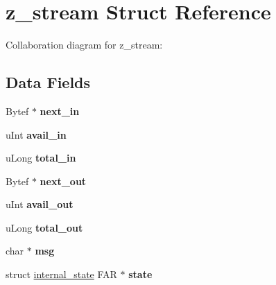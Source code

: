 \hypertarget{structz__stream}{\section{z\-\_\-stream Struct Reference}
\label{d2/d34/structz__stream}
}


Collaboration diagram for z\-\_\-stream\-:
\subsection*{Data Fields}
\begin{DoxyCompactItemize}
\item 
\hypertarget{structz__stream_abea40a334c642cae56275e32f1bd7f11}{Bytef $\ast$ {\bfseries next\-\_\-in}}\label{d2/d34/structz__stream_abea40a334c642cae56275e32f1bd7f11}

\item 
\hypertarget{structz__stream_a687b6a0bbb7485527e4f9d1a443b144b}{u\-Int {\bfseries avail\-\_\-in}}\label{d2/d34/structz__stream_a687b6a0bbb7485527e4f9d1a443b144b}

\item 
\hypertarget{structz__stream_a37acd10cd6841ba0ad5bee7c910e5ef9}{u\-Long {\bfseries total\-\_\-in}}\label{d2/d34/structz__stream_a37acd10cd6841ba0ad5bee7c910e5ef9}

\item 
\hypertarget{structz__stream_a5e34f774c4940b8aa5fe476390864192}{Bytef $\ast$ {\bfseries next\-\_\-out}}\label{d2/d34/structz__stream_a5e34f774c4940b8aa5fe476390864192}

\item 
\hypertarget{structz__stream_a39ffd574ef0c5160c8b9ad373b8dd27a}{u\-Int {\bfseries avail\-\_\-out}}\label{d2/d34/structz__stream_a39ffd574ef0c5160c8b9ad373b8dd27a}

\item 
\hypertarget{structz__stream_a3478dda91cd0a6d88a54af293c174f38}{u\-Long {\bfseries total\-\_\-out}}\label{d2/d34/structz__stream_a3478dda91cd0a6d88a54af293c174f38}

\item 
\hypertarget{structz__stream_ad675908c2bdd3b63a4657c7a1604e868}{char $\ast$ {\bfseries msg}}\label{d2/d34/structz__stream_ad675908c2bdd3b63a4657c7a1604e868}

\item 
\hypertarget{structz__stream_a400602c0144ebe93739d9432fe54e1bd}{struct \hyperlink{structinternal__state}{internal\-\_\-state} F\-A\-R $\ast$ {\bfseries state}}\label{d2/d34/structz__stream_a400602c0144ebe93739d9432fe54e1bd}


\end{DoxyCompactItemize}
